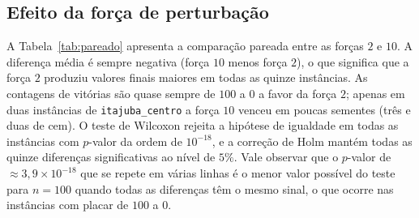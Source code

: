 \documentclass[11pt,a4paper]{article}
\newcommand{\code}[1]{\texttt{#1}}
\begin{document}
\subsection{Efeito da força de perturbação}

A Tabela~\ref{tab:pareado} apresenta a comparação pareada entre as forças $2$ e $10$. A diferença média é sempre negativa (força $10$ menos força $2$), o que significa que a força $2$ produziu valores finais maiores em todas as quinze instâncias. As contagens de vitórias são quase sempre de $100$ a $0$ a favor da força $2$; apenas em duas instâncias de \code{itajuba\_centro} a força $10$ venceu em poucas sementes (três e duas de cem). O teste de Wilcoxon rejeita a hipótese de igualdade em todas as instâncias com $p$-valor da ordem de $10^{-18}$, e a correção de Holm mantém todas as quinze diferenças significativas ao nível de $5\%$. Vale observar que o $p$-valor de $\approx 3{,}9 \times 10^{-18}$ que se repete em várias linhas é o menor valor possível do teste para $n = 100$ quando todas as diferenças têm o mesmo sinal, o que ocorre nas instâncias com placar de $100$ a $0$.
\end{document}
